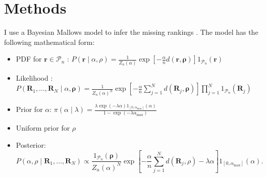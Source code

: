 \documentclass[hidelinks,11pt]{article}
\begin{document}
\begin{table}[]\centering
{}
\caption{Frequency of pairwise comparisons in the dataset.}

\label{Tab:Tcpairwise}
\end{table}


\section{Methods}

I use a Bayesian Mallows model to infer the missing rankings
\parencite{sorensen2019bayesmallows}. The model has the following mathematical form:
\begin{itemize}
\item PDF for \(\mathbf{r} \in \mathcal{P}_{n}\) : \(P(\mathbf{r} \mid \alpha, \rho)=\frac{1}{Z_{n}(\alpha)} \exp \left[-\frac{\alpha}{n} d(\mathbf{r}, \boldsymbol{\rho})\right] 1_{\mathcal{P}_{n}}(\mathbf{r})\)
    \item Likelihood :
           \(P\left(\mathbf{R}_{1}, \ldots, \mathbf{R}_{N} \mid \alpha, \boldsymbol{\rho}\right)=\frac{1}{Z_{n}(\alpha)^{N} } \exp \left[-\frac{\alpha}{n} \sum_{j=1}^{N} d\left(\mathbf{R}_{j}, \boldsymbol{\rho}\right)\right] \prod_{j=1}^{N} 1_{\mathcal{P}_{n}}\left(\mathbf{R}_{j}\right)\)

    \item Prior for \(\alpha\):
          \(
\pi(\alpha \mid \lambda)=\frac{\lambda \exp (-\lambda \alpha) 1_{\left[0, \alpha_{\max }\right]}(\alpha)}{1-\exp \left(-\lambda \alpha_{\max }\right)}\)
  \item Uniform prior for \(\rho\)
    \item Posterior:
          \[P\left(\alpha, \rho \mid \mathbf{R}_{1}, \ldots, \mathbf{R}_{N}\right) \propto \frac{1_{\mathcal{P}_{n}}(\boldsymbol{\rho})}{Z_{n}(\alpha)^{N}} \exp \left[-\frac{\alpha}{n} \sum_{j=1}^{N} d\left(\mathbf{R}_{j}, \rho\right)-\lambda \alpha\right] 1_{\left[0, \alpha_{\max }\right]}(\alpha) .\]
\end{itemize}
\end{document}
